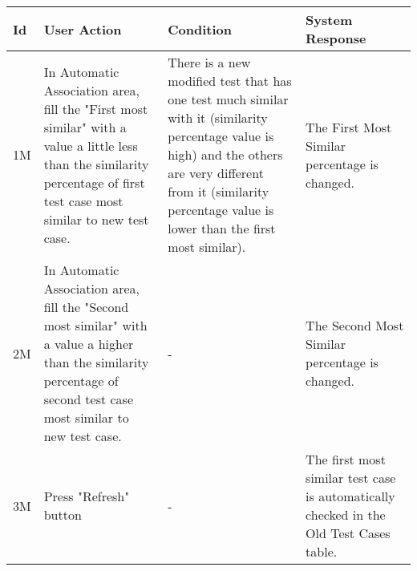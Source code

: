 \documentclass[a4paper,11pt]{article}
\newcommand{\bl}{\\ \hline}
\begin{document}
\begin{tabular}{|p{0.8in}|p{1.6in}|p{1.6in}|p{1.6in}|}
\hline
Id & User Action & Condition & System Response  \bl 
1M & In Automatic Association area, fill the "First most
						similar" with a value a little less than the similarity percentage
						of first test case most similar to new test case. & There is a new modified test that has one test much
						similar with it (similarity percentage value is high) and the
						others are very different from it (similarity percentage value is
						lower than the first most similar). & The First Most Similar percentage is changed. \bl 
2M & In Automatic Association area, fill the "Second most
						similar" with a value a higher than the similarity percentage of
						second test case most similar to new test case. & - & The Second Most Similar percentage is changed. \bl 
3M & Press "Refresh" button & - & The first most similar test case is automatically checked
						in the Old Test Cases table. \bl 
\end{tabular}
\end{document}
